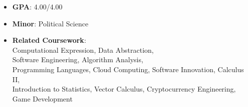 \documentclass[10pt,a4paper,ragged2e]{altacv}
\begin{document}
\tagline{}

\begin{fullwidth}
  \makecvheader
\end{fullwidth}




\begin{itemize}
  \item \textbf{GPA}: 4.00/4.00
  \item \textbf{Minor}: Political Science
  \item \textbf{Related Coursework}:\\ Computational Expression, Data Abstraction, \\ Software Engineering, Algorithm Analysis, \\ Programming Languages, Cloud Computing, Software Innovation, Calculus II, \\ Introduction to Statistics, Vector Calculus, Cryptocurrency Engineering, Game Development
\end{itemize}
\end{document}
